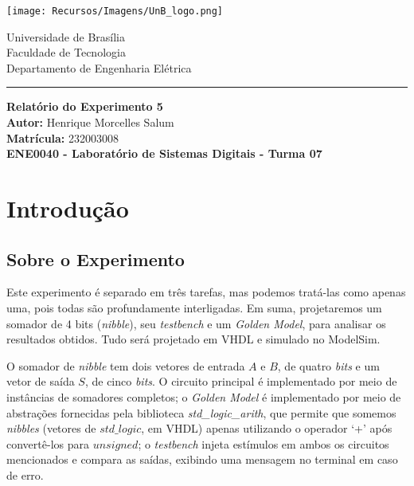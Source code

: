 \documentclass[a4paper,12pt]{article}
\newcommand{\capa}{
    \begin{titlepage}
        \begin{multicols}{2}
            \begin{flushleft}
                \texttt{[image: Recursos/Imagens/UnB\_logo.png]}
            \end{flushleft}
            \columnbreak
            \begin{flushright}
                Universidade de Brasília \\
                Faculdade de Tecnologia \\
                Departamento de Engenharia Elétrica
            \end{flushright}
        \end{multicols}
        \begin{center}
        \vspace{-20pt}
        \rule{\textwidth}{0.4pt}
        \end{center}
        \vspace{0.6cm}
        \begin{center}
            {\Huge \textbf{Relatório do Experimento 5}} \\[1em]
            {\large \textbf{Autor:} Henrique Morcelles Salum} \\[0.5em]
            {\large \textbf{Matrícula:} 232003008} \\
            \vfill
            {\large \textbf{ENE0040 - Laboratório de Sistemas Digitais - Turma 07}} \\
        \end{center}
    \end{titlepage}
}
\begin{document}
\capa

\newpage
\tableofcontents
\newpage

\section{Introdução}

\subsection{Sobre o Experimento}
Este experimento é separado em três tarefas, mas podemos tratá-las como apenas uma, pois todas são profundamente interligadas. Em suma, projetaremos um somador de 4 bits (\textit{nibble}), seu \textit{testbench} e um \textit{Golden Model}, para analisar os resultados obtidos. Tudo será projetado em VHDL e simulado no ModelSim.

O somador de \textit{nibble} tem dois vetores de entrada $A$ e $B$, de quatro \textit{bits} e um vetor de saída $S$, de cinco \textit{bits}. O circuito principal é implementado por meio de instâncias de somadores completos; o \textit{Golden Model} é implementado por meio de abstrações fornecidas pela biblioteca \textit{std\_logic\_arith}, que permite que somemos \textit{nibbles} (vetores de $std\_logic$, em VHDL) apenas utilizando o operador `+' após convertê-los para $unsigned$; o \textit{testbench} injeta estímulos em ambos os circuitos mencionados e compara as saídas, exibindo uma mensagem no terminal em caso de erro. 
\end{document}
